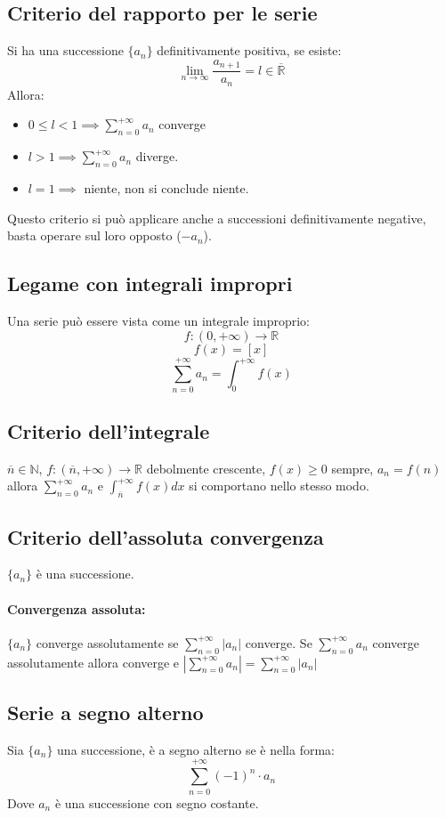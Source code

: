 \documentclass[12pt,a4paper]{article}
\begin{document}
\subsection{Criterio del rapporto per le serie}
Si ha una successione $\{a_n\}$ definitivamente positiva, se esiste:
\[
\lim_{n \to \infty} \frac{a_{n+1}}{a_n} = l \in \overline{\mathbb{R}}
\]
Allora:
\begin{itemize}
  \item $0 \leq l < 1 \implies \sum_{n=0}^{+\infty} a_n$ converge
  \item $l > 1 \implies \sum_{n=0}^{+\infty} a_n$ diverge. 
  \item $l = 1 \implies$ niente, non si conclude niente.
\end{itemize}
Questo criterio si può applicare anche a successioni definitivamente negative, basta operare sul loro opposto ($-a_n$).
\subsection{Legame con integrali impropri}
Una serie può essere vista come un integrale improprio:
\[
f:(0,+\infty) \to \mathbb{R}
\]
\[
f(x) = [x]
\]
\[
\sum_{n=0}^{+\infty} a_n = \int_{0}^{+\infty} f(x)
\]
\subsection{Criterio dell'integrale}
$\overline{n} \in \mathbb{N}$, $f:(\overline{n},+\infty) \to \mathbb{R}$ debolmente crescente, $f(x) \geq 0$ sempre, $a_n = f(n)$ allora $\sum_{n=0}^{+\infty} a_n$ e $\int_{\overline{n}}^{+\infty} f(x)dx$ si comportano nello stesso modo.
\subsection{Criterio dell'assoluta convergenza}
$\{a_n\}$ è una successione.
\paragraph{Convergenza assoluta:} $\{a_n\}$ converge assolutamente se $\sum_{n=0}^{+\infty} |a_n|$ converge.
Se $\sum_{n=0}^{+\infty} a_n$ converge assolutamente allora converge e $|\sum_{n=0}^{+\infty} a_n| = \sum_{n=0}^{+\infty} |a_n|$
\subsection{Serie a segno alterno}
Sia $\{a_n\}$ una successione, è a segno alterno se è nella forma:
\[
\sum_{n=0}^{+\infty} (-1)^n \cdot a_n
\]
Dove $a_n$ è una successione con segno costante.
\end{document}
